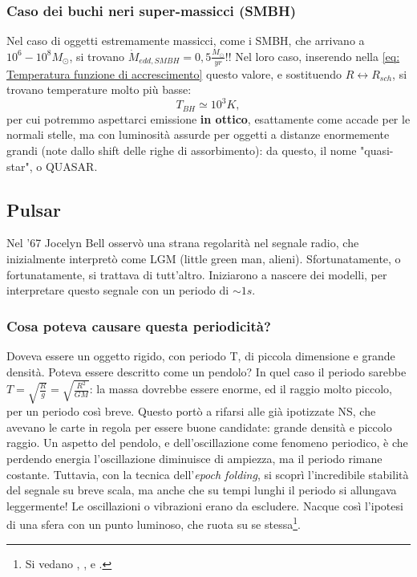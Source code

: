 \subsubsection{Caso dei buchi neri super-massicci (SMBH)}
Nel caso di oggetti estremamente massicci, come i SMBH, che arrivano a $10^6-10^8 M_{\odot}$, si trovano $\dot{M}_{edd,SMBH}=0,5\frac{M_{\odot}}{yr}$!!
Nel loro caso, inserendo nella \eqref{eq: Temperatura funzione di accrescimento} questo valore, e sostituendo $R\longleftrightarrow R_{sch}$, si trovano temperature molto più basse:
\begin{equation}
    T_{BH}\simeq 10^3K,
\end{equation}
per cui potremmo aspettarci emissione \textbf{in ottico}, esattamente come accade per le normali stelle, ma con luminosità assurde per oggetti a distanze enormemente grandi (note dallo shift delle righe di assorbimento): da questo, il nome "quasi-star", o QUASAR.


\subsection{Pulsar}
Nel '67 Jocelyn Bell osservò una strana regolarità nel segnale radio, che inizialmente interpretò come LGM (little green man, alieni).
Sfortunatamente, o fortunatamente, si trattava di tutt'altro.
Iniziarono a nascere dei modelli, per interpretare questo segnale con un periodo di $\sim1s$.

\subsubsection{Cosa poteva causare questa periodicità?}
Doveva essere un oggetto rigido, con periodo T, di piccola dimensione e grande densità.
Poteva essere descritto come un pendolo?
In quel caso il periodo sarebbe $T=\sqrt{\frac{R}{g}} = \sqrt{\frac{R^2}{GM}} $: la massa dovrebbe essere enorme, ed il raggio molto piccolo, per un periodo così breve.
Questo portò a rifarsi alle già ipotizzate NS, che avevano le carte in regola per essere buone candidate: grande densità e piccolo raggio.
Un aspetto del pendolo, e dell'oscillazione come fenomeno periodico, è che perdendo energia l'oscillazione diminuisce di ampiezza, ma il periodo rimane costante.
Tuttavia, con la tecnica dell'\textit{epoch folding}, si scoprì l'incredibile stabilità del segnale su breve scala, ma anche che su tempi lunghi il periodo si allungava leggermente! 
Le oscillazioni o vibrazioni erano da escludere.
Nacque così l'ipotesi di una sfera con un punto luminoso, che ruota su se stessa\footnote{Si vedano \cite{Pacini}, \cite{Gold}, \cite{Ostriker_Gunn} e \cite{Goldreich_Julian}.}.


